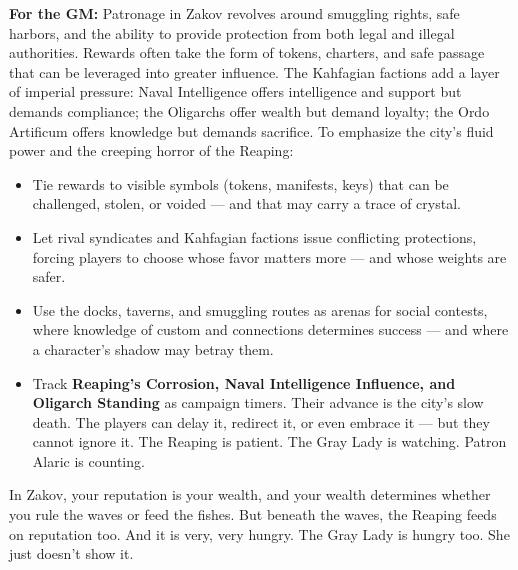 \begin{tcolorbox}[colback=black!3,colframe=black!40!white,title={Patronage \& Power},breakable]
\vspace{2mm}
\textbf{For the GM:}  
Patronage in Zakov revolves around smuggling rights, safe harbors, and the ability to provide protection from both legal and illegal authorities. Rewards often take the form of tokens, charters, and safe passage that can be leveraged into greater influence. The Kahfagian factions add a layer of imperial pressure: Naval Intelligence offers intelligence and support but demands compliance; the Oligarchs offer wealth but demand loyalty; the Ordo Artificum offers knowledge but demands sacrifice. To emphasize the city's fluid power and the creeping horror of the Reaping:
\begin{itemize}
\item Tie rewards to visible symbols (tokens, manifests, keys) that can be challenged, stolen, or voided --- and that may carry a trace of crystal.
\item Let rival syndicates and Kahfagian factions issue conflicting protections, forcing players to choose whose favor matters more --- and whose weights are safer.
\item Use the docks, taverns, and smuggling routes as arenas for social contests, where knowledge of custom and connections determines success --- and where a character's shadow may betray them.
\item Track \textbf{Reaping's Corrosion, Naval Intelligence Influence, and Oligarch Standing} as campaign timers. Their advance is the city's slow death. The players can delay it, redirect it, or even embrace it --- but they cannot ignore it. The Reaping is patient. The Gray Lady is watching. Patron Alaric is counting.
\end{itemize}
In Zakov, your reputation is your wealth, and your wealth determines whether you rule the waves or feed the fishes. But beneath the waves, the Reaping feeds on reputation too. And it is very, very hungry. The Gray Lady is hungry too. She just doesn't show it.
\end{tcolorbox}

